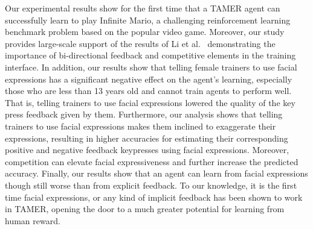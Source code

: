 \documentclass[10pt,journal,compsoc]{IEEEtran}
\begin{document}
Our experimental results show for the first time that a TAMER agent can successfully learn to play Infinite Mario, a challenging reinforcement learning benchmark problem ba\-sed on the popular video game. %
Moreover, our study provides large-scale support of the results of Li et al.\ \cite{li2013using,li2014learning} demonstrating the importance of bi-directional feedback and competitive elements in the training interface. 
In addition, %
our results show that telling female trainers to use facial expressions has a significant negative effect on the agent's learning, %
especially those who are less than 13 years old and cannot train agents to perform well. %
That is, telling trainers to use facial expressions lowered the quality of the key press feedback given by them. %
Furthermore, our analysis shows that telling trainers to use facial expressions makes them inclined to exaggerate their expressions, resulting in higher accuracies for estimating their corresponding positive and negative feedback keypresses using facial expressions. Moreover, competition can elevate facial expressiveness and further increase the predicted accuracy. Finally, our results show that an agent can learn from facial expressions though still worse than from explicit feedback. To our knowledge, it is the first time facial expressions, or any kind of implicit feedback has been shown to work in TAMER, opening the door to a much greater potential for learning from human reward.
\end{document}
